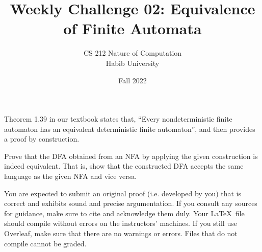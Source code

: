 \documentclass[a4paper]{exam}
\title{Weekly Challenge 02: Equivalence of Finite Automata}
\author{CS 212 Nature of Computation\\Habib University}
\date{Fall 2022}
\begin{document}
\maketitle

\begin{questions}
  

  Theorem 1.39 in our textbook states that, ``Every nondeterministic finite automaton has an equivalent deterministic finite automaton'', and then provides a proof by construction.

  Prove that the DFA obtained from an NFA by applying the given construction is indeed equivalent. That is, show that the constructed DFA accepts the same language as the given NFA and vice versa.
  
  You are expected to submit an original proof (i.e. developed by you) that is correct and exhibits sound and precise argumentation. If you consult any sources for guidance, make sure to cite and acknowledge them duly. Your \LaTeX\ file should compile without errors on the instructors' machines. If you still use Overleaf, make sure that there are no warnings or errors. Files that do not compile cannot be graded.
  
  \begin{solution}
  \end{solution}
\end{questions}
\end{document}
